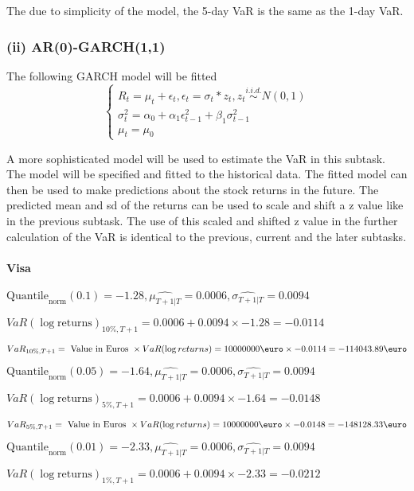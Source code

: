 The due to simplicity of the model, the 5-day VaR is the same as the 1-day VaR.


\subsubsection{(ii) AR(0)-GARCH(1,1)}
 The following GARCH model will be fitted 
$$\begin{cases} R_t = \mu_t + \epsilon_t, \epsilon_t = \sigma_t  * z_t, z_t \overset{i.i.d.}{\sim} N(0,1) \\ \sigma^2_t = \alpha_0 + \alpha_1 \epsilon^2_{t-1} + \beta_1 \sigma^2_{t-1} \\ \mu_t = \mu_0 \end{cases}$$

A more sophisticated model will be used to estimate the VaR in this subtask. 
The model will be specified and fitted to the historical data. The fitted model can then be used to make predictions about the stock returns in the future. The predicted mean and sd of the returns can be used to scale and shift a z value like in the previous subtask.
The use of this scaled and shifted z value in the further calculation of the VaR is identical to the previous, current and the later subtasks.
\paragraph{Visa}


$\text{Quantile}_\text{norm}(0.1) = -1.28,\hat{\mu_{T+1|T}} = 0.0006, \hat{\sigma_{T+1|T}} = 0.0094$

$VaR(\log \text{returns})_{10\%, T + 1} = 0.0006 + 0.0094\times-1.28 = -0.0114$

$VaR_{10\%, T + 1} = \text{ Value in Euros } \times VaR(\log returns) = 10 000 000 \text{\euro} \times-0.0114 = -114043.89 \text{\euro}$


$\text{Quantile}_\text{norm}(0.05) = -1.64,\hat{\mu_{T+1|T}} = 0.0006, \hat{\sigma_{T+1|T}} = 0.0094$

$VaR(\log \text{returns})_{5\%, T + 1} = 0.0006 + 0.0094\times-1.64 = -0.0148$

$VaR_{5\%, T + 1} = \text{ Value in Euros } \times VaR(\log returns) = 10 000 000 \text{\euro} \times-0.0148 = -148128.33 \text{\euro}$


$\text{Quantile}_\text{norm}(0.01) = -2.33,\hat{\mu_{T+1|T}} = 0.0006, \hat{\sigma_{T+1|T}} = 0.0094$

$VaR(\log \text{returns})_{1\%, T + 1} = 0.0006 + 0.0094\times-2.33 = -0.0212$

